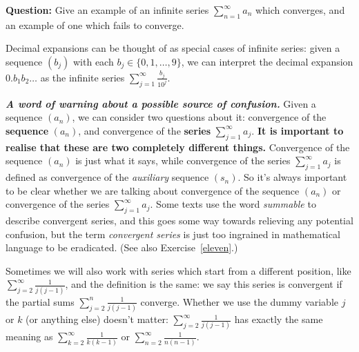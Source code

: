\documentclass[11pt,dvipsnames]{book}
\numberwithin{figure}{section} %
\numberwithin{table}{section} %
\begin{document}
\medskip
\noindent
{\bf Question:} Give an example of an infinite series $\sum_{n=1}^\infty a_n$ which converges, and an example of one which fails to converge.

\medskip
Decimal expansions can be thought of as special cases of infinite series: given a sequence $(b_j)$ with each $b_j \in \{0, 1, \dots , 9\}$, we can interpret the decimal expansion $0.b_1b_2 \dots$ as the infinite series $\sum_{j=1}^\infty \frac{b_j}{10^j}$.

\medskip
\noindent
{\em \bf \em A word of warning about a possible source of confusion.} Given a sequence $(a_n)$, we can consider two questions about it: convergence of the {\bf sequence} $(a_n)$, and convergence of the {\bf series} $\sum_{j=1}^\infty a_j$. {\bf It is important to realise that these are two completely different things.} Convergence of the sequence $(a_n)$ is just what it says, while convergence of the series $\sum_{j=1}^\infty a_j$
is defined as convergence of the {\em auxiliary} sequence $(s_n)$. So it's always important to be clear whether we are talking about convergence of the sequence $(a_n)$ or convergence of the series $\sum_{j=1}^\infty a_j$. Some texts use the word \emph{summable} to describe convergent series, and this goes some way towards relieving any potential confusion, but the term \emph{convergent series} is just too ingrained in mathematical language to be eradicated. (See also Exercise~\ref{eleven}.)

\medskip
Sometimes we will also work with series which start from a different position, like $\sum_{j=2}^{\infty} \frac{1}{j(j-1)}$, and the definition is the same: we say this series is convergent if the partial sums $\sum_{j=2}^{n} \frac{1}{j(j-1)}$ converge. Whether we use the dummy variable
$j$ or $k$ (or anything else) doesn't matter: $\sum_{j=2}^{\infty} \frac{1}{j(j-1)}$ has exactly the same meaning as $\sum_{k=2}^{\infty} \frac{1}{k(k-1)}$ or $\sum_{n=2}^{\infty} \frac{1}{n(n-1)}$.
\end{document}
